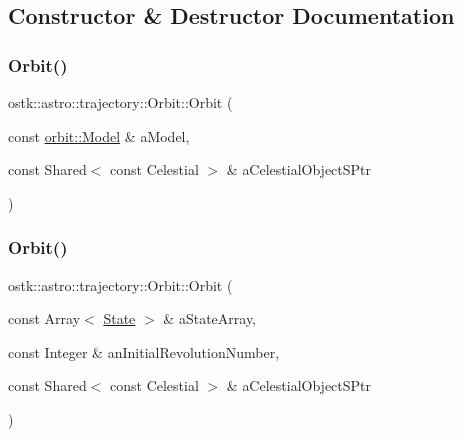 \subsection{Constructor \& Destructor Documentation}
\mbox{\label{classostk_1_1astro_1_1trajectory_1_1_orbit_aaccbf7c99f454ba6acd8aff68a2137bf}} 
\subsubsection{\texorpdfstring{Orbit()}{Orbit()}\hspace{0.1cm}{\footnotesize\ttfamily [1/3]}}
{\footnotesize\ttfamily ostk\+::astro\+::trajectory\+::\+Orbit\+::\+Orbit (\begin{DoxyParamCaption}\item[{const \hyperlink{classostk_1_1astro_1_1trajectory_1_1orbit_1_1_model}{orbit\+::\+Model} \&}]{a\+Model,  }\item[{const Shared$<$ const Celestial $>$ \&}]{a\+Celestial\+Object\+S\+Ptr }\end{DoxyParamCaption})}

\mbox{\label{classostk_1_1astro_1_1trajectory_1_1_orbit_ac5396ec3866ad7afe7384bbfc4d41339}} 
\subsubsection{\texorpdfstring{Orbit()}{Orbit()}\hspace{0.1cm}{\footnotesize\ttfamily [2/3]}}
{\footnotesize\ttfamily ostk\+::astro\+::trajectory\+::\+Orbit\+::\+Orbit (\begin{DoxyParamCaption}\item[{const Array$<$ \hyperlink{classostk_1_1astro_1_1trajectory_1_1_state}{State} $>$ \&}]{a\+State\+Array,  }\item[{const Integer \&}]{an\+Initial\+Revolution\+Number,  }\item[{const Shared$<$ const Celestial $>$ \&}]{a\+Celestial\+Object\+S\+Ptr }\end{DoxyParamCaption})}

